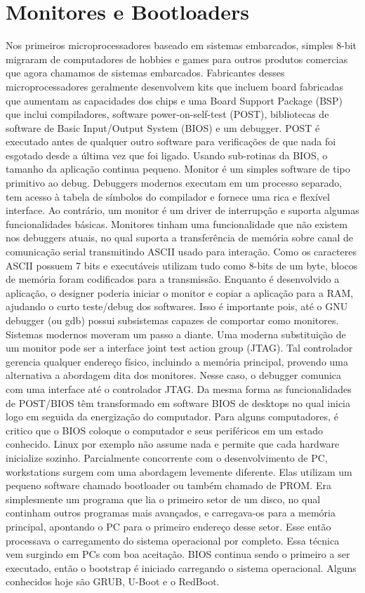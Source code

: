 \section{Monitores e Bootloaders}
Nos primeiros microprocessadores baseado em sistemas embarcados, simples 8-bit migraram de computadores de hobbies e games para outros produtos comercias que agora chamamos de sistemas embarcados. Fabricantes desses microprocessadores geralmente desenvolvem kits que incluem board fabricadas que aumentam as capacidades dos chips e uma Board Support Package (BSP) que inclui compiladores, software power-on-self-test (POST), bibliotecas de software de Basic Input/Output System (BIOS) e um debugger. POST é executado antes de qualquer outro software para verificações de que nada foi esgotado desde a última vez que foi ligado. Usando sub-rotinas da BIOS, o tamanho da aplicação continua pequeno.
Monitor é um simples software de tipo primitivo ao debug. Debuggers modernos executam em um processo separado, tem acesso à tabela de símbolos do compilador e fornece uma rica e flexível interface. Ao contrário, um monitor é um driver de interrupção e suporta algumas funcionalidades básicas. Monitores tinham uma funcionalidade que não existem nos debuggers atuais, no qual suporta a transferência de memória sobre canal de comunicação serial transmitindo ASCII usado para interação. Como os caracteres ASCII possuem 7 bits e executáveis utilizam tudo como 8-bits de um byte, blocos de memória foram codificados para a transmissão. Enquanto é desenvolvido a aplicação, o designer poderia iniciar o monitor e copiar a aplicação para a RAM, ajudando o curto teste/debug dos softwares. Isso é importante pois, até o GNU debugger (ou gdb) possui subsistemas capazes de comportar como monitores.
Sistemas modernos moveram um passo a diante. Uma moderna substituição de um monitor pode ser a interface joint test action group (JTAG). Tal controlador gerencia qualquer endereço físico, incluindo a memória principal, provendo uma alternativa a abordagem dita dos monitores. Nesse caso, o debugger comunica com uma interface até o controlador JTAG. Da mesma forma as funcionalidades de POST/BIOS têm transformado em software BIOS de desktops no qual inicia logo em seguida da energização do computador. Para alguns computadores, é critico que o BIOS coloque o computador e seus periféricos em um estado conhecido. Linux por exemplo não assume nada e permite que cada hardware inicialize sozinho. Parcialmente concorrente com o desenvolvimento de PC, workstations surgem com uma abordagem levemente diferente. Elas utilizam um pequeno software chamado bootloader ou também chamado de PROM. Era simplesmente um programa que lia o primeiro setor de um disco, no qual continham outros programas mais avançados, e carregava-os para a memória principal, apontando o PC para o primeiro endereço desse setor. Esse então processava o carregamento do sistema operacional por completo. Essa técnica vem surgindo em PCs com boa aceitação. BIOS continua sendo o primeiro a ser executado, então o bootstrap é iniciado carregando o sistema operacional. Alguns conhecidos hoje são GRUB, U-Boot e o RedBoot.

